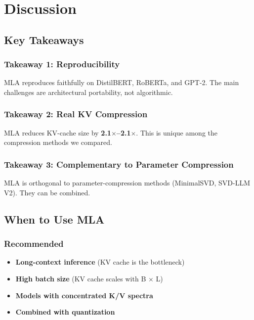 
\section{Discussion}

\subsection{Key Takeaways}

\subsubsection{Takeaway 1: Reproducibility}

MLA reproduces faithfully on DistilBERT, RoBERTa, and GPT-2. The main 
challenges are architectural portability, not algorithmic.

\subsubsection{Takeaway 2: Real KV Compression}

MLA reduces KV-cache size by \textbf{2.1$\times$--2.1$\times$}. This is 
unique among the compression methods we compared.

\subsubsection{Takeaway 3: Complementary to Parameter Compression}

MLA is orthogonal to parameter-compression methods (MinimalSVD, SVD-LLM V2). 
They can be combined.

\subsection{When to Use MLA}

\subsubsection{Recommended}

\begin{itemize}
\item \textbf{Long-context inference} (KV cache is the bottleneck)
\item \textbf{High batch size} (KV cache scales with B $\times$ L)
\item \textbf{Models with concentrated K/V spectra}
\item \textbf{Combined with quantization}

\end{itemize}

